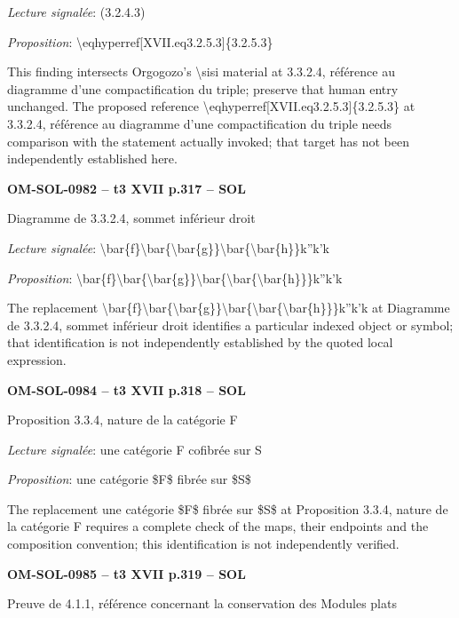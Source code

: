 \emph{Lecture signalée}: (3.2.4.3)\par
\emph{Proposition}: \textbackslash{}eqhyperref[XVII.eq3.2.5.3]\{3.2.5.3\}\par
This finding intersects Orgogozo's \textbackslash{}sisi material at 3.3.2.4, référence au diagramme d'une compactification du triple; preserve that human entry unchanged. The proposed reference \textbackslash{}eqhyperref[XVII.eq3.2.5.3]\{3.2.5.3\} at 3.3.2.4, référence au diagramme d'une compactification du triple needs comparison with the statement actually invoked; that target has not been independently established here.\par
\par\noindent\textbf{OM-SOL-0982 -- t3 XVII p.317 -- SOL}\par
Diagramme de 3.3.2.4, sommet inférieur droit\par
\emph{Lecture signalée}: \textbackslash{}bar\{f\}\textbackslash{}bar\{\textbackslash{}bar\{g\}\}\textbackslash{}bar\{\textbackslash{}bar\{h\}\}k''k'k\par
\emph{Proposition}: \textbackslash{}bar\{f\}\textbackslash{}bar\{\textbackslash{}bar\{g\}\}\textbackslash{}bar\{\textbackslash{}bar\{\textbackslash{}bar\{h\}\}\}k''k'k\par
The replacement \textbackslash{}bar\{f\}\textbackslash{}bar\{\textbackslash{}bar\{g\}\}\textbackslash{}bar\{\textbackslash{}bar\{\textbackslash{}bar\{h\}\}\}k''k'k at Diagramme de 3.3.2.4, sommet inférieur droit identifies a particular indexed object or symbol; that identification is not independently established by the quoted local expression.\par
\par\noindent\textbf{OM-SOL-0984 -- t3 XVII p.318 -- SOL}\par
Proposition 3.3.4, nature de la catégorie F\par
\emph{Lecture signalée}: une catégorie F cofibrée sur S\par
\emph{Proposition}: une catégorie \$F\$ fibrée sur \$S\$\par
The replacement une catégorie \$F\$ fibrée sur \$S\$ at Proposition 3.3.4, nature de la catégorie F requires a complete check of the maps, their endpoints and the composition convention; this identification is not independently verified.\par
\par\noindent\textbf{OM-SOL-0985 -- t3 XVII p.319 -- SOL}\par
Preuve de 4.1.1, référence concernant la conservation des Modules plats\par
